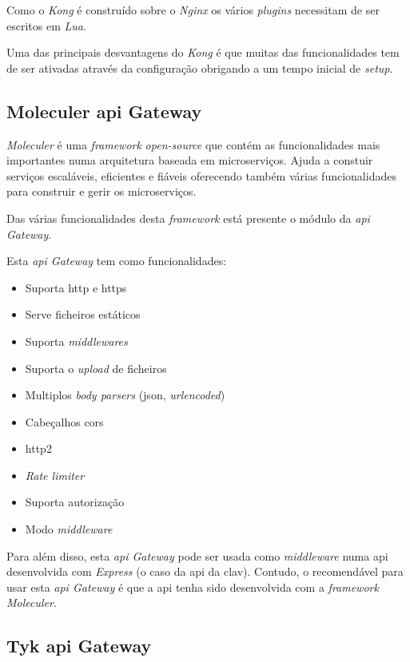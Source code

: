 Como o \textit{Kong} é construído sobre o \textit{Nginx} os vários \textit{plugins} necessitam de ser escritos em \textit{Lua}.

Uma das principais desvantagens do \textit{Kong} é que muitas das funcionalidades tem de ser ativadas através da configuração obrigando a um tempo inicial de \textit{setup}.

\subsection{Moleculer \acrshort{api} Gateway}

\textit{Moleculer} é uma \textit{framework} \textit{open-source} que contém as funcionalidades mais importantes numa arquitetura baseada em microserviços. Ajuda a constuir serviços escaláveis, eficientes e fiáveis oferecendo também várias funcionalidades para construir e gerir os microserviços.

Das várias funcionalidades desta \textit{framework} está presente o módulo da \textit{\acrshort{api} Gateway}.

Esta \textit{\acrshort{api} Gateway} tem como funcionalidades:~\cite{moleculerAPIG}
\begin{itemize}
    \item Suporta \acrshort{http} e \acrshort{https}
    \item Serve ficheiros estáticos
    \item Suporta \textit{middlewares}
    \item Suporta o \textit{upload} de ficheiros
    \item Multiplos \textit{body parsers} (\acrshort{json}, \textit{urlencoded})
    \item Cabeçalhos \acrshort{cors}
    \item \acrshort{http}2
    \item \textit{Rate limiter}
    \item Suporta autorização
    \item Modo \textit{middleware}
\end{itemize}

Para além disso, esta \textit{\acrshort{api} Gateway} pode ser usada como \textit{middleware} numa \acrshort{api} desenvolvida com \textit{Express} (o caso da \acrshort{api} da \acrshort{clav}). Contudo, o recomendável para usar esta \textit{\acrshort{api} Gateway} é que a \acrshort{api} tenha sido desenvolvida com a \textit{framework} \textit{Moleculer}.

\subsection{Tyk \acrshort{api} Gateway}

